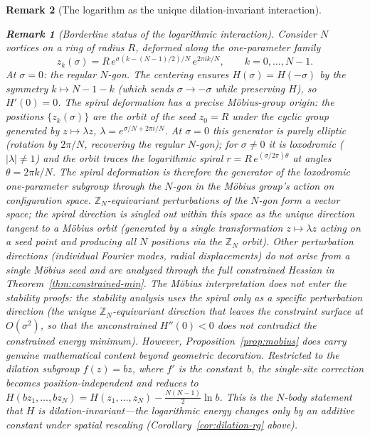 \documentclass[12pt, a4paper]{article}
\newtheorem{remark}{Remark}[section]
\numberwithin{equation}{section}
\begin{document}
\begin{remark}[The logarithm as the unique dilation-invariant interaction]
\begin{remark}[Borderline status of the logarithmic interaction]
Consider $N$ vortices on a ring of radius $R$, deformed along the
one-parameter family
\begin{equation}\label{eq:deformation}
  z_k(\sigma) = R\,e^{\sigma(k - (N-1)/2)/N}\,e^{2\pi ik/N},
  \qquad k = 0, \ldots, N-1.
\end{equation}
At $\sigma = 0$: the regular $N$-gon.  The centering ensures
$H(\sigma) = H(-\sigma)$ by the symmetry $k \mapsto N-1-k$
(which sends $\sigma \to -\sigma$ while preserving $H$), so
$H'(0) = 0$.  The spiral deformation has a precise M\"obius-group
origin: the positions $\{z_k(\sigma)\}$ are the orbit of the seed
$z_0 = R$ under the cyclic group generated by $z \mapsto \lambda z$,
$\lambda = e^{\sigma/N + 2\pi i/N}$.  At $\sigma = 0$ this generator
is purely elliptic (rotation by $2\pi/N$, recovering the regular
$N$-gon); for $\sigma \ne 0$ it is loxodromic ($|\lambda| \ne 1$) and
the orbit traces the logarithmic spiral $r = R\,e^{(\sigma/2\pi)\theta}$
at angles $\theta = 2\pi k/N$.  The spiral deformation is therefore the
generator of the loxodromic one-parameter subgroup through the $N$-gon
in the M\"obius group's action on configuration space.
$\mathbb{Z}_N$-equivariant perturbations of the $N$-gon form a vector
space; the spiral direction is singled out within this space as the
unique direction tangent to a M\"obius orbit (generated by a single
transformation $z \mapsto \lambda z$ acting on a seed point and
producing all $N$ positions via the $\mathbb{Z}_N$ orbit).  Other
perturbation directions (individual Fourier modes, radial displacements)
do not arise from a single M\"obius seed and are analyzed through the
full constrained Hessian in Theorem~\ref{thm:constrained-min}.
The M\"obius interpretation does not enter the stability proofs:
the stability analysis uses the spiral only as a specific perturbation
direction (the unique $\mathbb{Z}_N$-equivariant direction that leaves
the constraint surface at $O(\sigma^2)$, so that the unconstrained
$H''(0) < 0$ does not contradict the constrained energy minimum).
However, Proposition~\ref{prop:mobius} does carry genuine mathematical
content beyond geometric decoration.  Restricted to the dilation
subgroup $f(z)=bz$, where $f'$ is the constant~$b$, the single-site
correction becomes position-independent and reduces to
$H(bz_1,\dots,bz_N) = H(z_1,\dots,z_N) - \tfrac{N(N-1)}{2}\ln b$.
This is the $N$-body statement that $H$ is dilation-invariant---the
logarithmic energy changes only by an additive constant under spatial
rescaling (Corollary~\ref{cor:dilation-rg} above).



\end{remark}
\end{remark}
\end{document}
